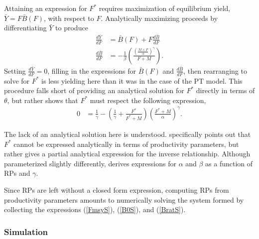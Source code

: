 \documentclass[12pt]{article}
\begin{document}
%
Attaining an expression for $F^*$ requires maximization of equilibrium 
yield, \mbox{$\bar{Y}=F\bar{B}(F)$}, with respect to $F$. Analytically maximizing 
proceeds by differentiating $\bar{Y}$ to produce
%
\begin{align}
\frac{d \bar{Y}}{dF} &= \bar B(F) + F \frac{d \bar B}{dF} \label{FderivS}\\
\frac{d \bar B}{dF} &= -\frac{1}{\beta}  \left(\frac{\left(\frac{M+F}{\alpha}\right)^\gamma}{F+M}\right)\label{dBdFS}.
\end{align}
%
Setting $\frac{d \bar{Y}}{dF}=0$, filling in the expressions for $\bar B(F)$ 
and $\frac{d \bar B}{dF}$, then rearranging to solve for $F^*$ is less 
yielding here than it was in the case of the PT model. This procedure falls 
short of providing an analytical solution for $F^*$ directly in terms of 
$\theta$, %
but rather shows that $F^*$ must respect the following expression,  
%
\begin{align}\label{FmsyS}
0 &= \frac{1}{\gamma} - \left(\frac{1}{\gamma} + \frac{F^*}{F^*+M}\right)\left(\frac{F^*+M}{\alpha}\right)^\gamma.  
\end{align}

The lack of an analytical solution here is understood. 
 specifically points out that 
$F^*$ cannot be expressed analytically in terms of productivity parameters, 
but rather gives a partial analytical expression for the inverse relationship. 
Although parameterized slightly differently,  
derives expressions for $\alpha$ and $\beta$ as a function of RPs and $\gamma$. 

%
Since RPs are left without a closed form expression, computing RPs from 
productivity parameters amounts to numerically solving the system formed by collecting the 
expressions (\ref{FmsyS}), (\ref{B0S}), and (\ref{BratS}).

%
\subsubsection{Simulation \label{sSim}}

\end{document}
